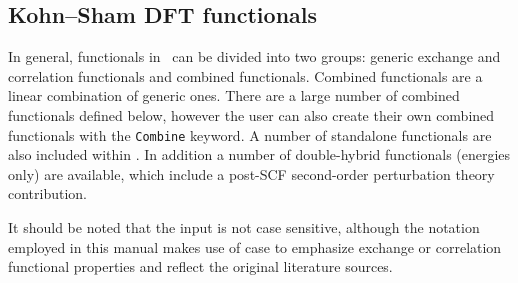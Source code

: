 \subsection{\label{ref-dft}Kohn--Sham DFT functionals}

In general, functionals in \dalton\ can be divided into two groups: 
generic exchange and correlation functionals 
and combined functionals. Combined functionals are a linear combination of
generic ones. There are a large number of combined functionals defined below, 
however the user can also create their own combined functionals with 
the \verb|Combine| keyword. 
A number of standalone functionals are also included within \dalton. 
In addition a number of double-hybrid functionals (energies only) are available,
which include a post-SCF second-order perturbation theory contribution. 

It should be noted that the input is not case sensitive, although the notation
employed in this manual makes use of case to emphasize exchange or correlation 
functional properties and reflect the original literature sources.


